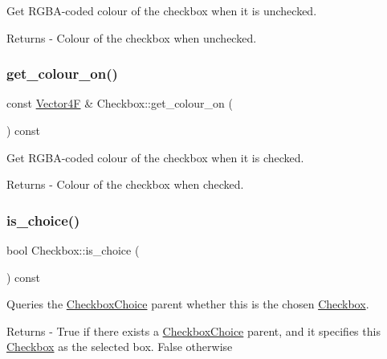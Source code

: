 Get R\+G\+B\+A-\/coded colour of the checkbox when it is unchecked. \begin{DoxyReturn}{Returns}
-\/ Colour of the checkbox when unchecked. 
\end{DoxyReturn}
\mbox{\label{class_checkbox_accb44cc4cde3fe6ad7a88b27831fa37a}} 
\subsubsection{\texorpdfstring{get\+\_\+colour\+\_\+on()}{get\_colour\_on()}}
{\footnotesize\ttfamily const \mbox{\hyperlink{class_vector4}{Vector4F}} \& Checkbox\+::get\+\_\+colour\+\_\+on (\begin{DoxyParamCaption}{ }\end{DoxyParamCaption}) const}

Get R\+G\+B\+A-\/coded colour of the checkbox when it is checked. \begin{DoxyReturn}{Returns}
-\/ Colour of the checkbox when checked. 
\end{DoxyReturn}
\mbox{\label{class_checkbox_a7d468fd5e0d9be7eeb498f511fa23f16}} 
\subsubsection{\texorpdfstring{is\+\_\+choice()}{is\_choice()}}
{\footnotesize\ttfamily bool Checkbox\+::is\+\_\+choice (\begin{DoxyParamCaption}{ }\end{DoxyParamCaption}) const\hspace{0.3cm}{\ttfamily [protected]}}

Queries the \mbox{\hyperlink{class_checkbox_choice}{Checkbox\+Choice}} parent whether this is the chosen \mbox{\hyperlink{class_checkbox}{Checkbox}}. \begin{DoxyReturn}{Returns}
-\/ True if there exists a \mbox{\hyperlink{class_checkbox_choice}{Checkbox\+Choice}} parent, and it specifies this \mbox{\hyperlink{class_checkbox}{Checkbox}} as the selected box. False otherwise 
\end{DoxyReturn}
\mbox{\label{class_checkbox_a63fc27bae94d81d4dee8cd2d0e474d2b}} 
